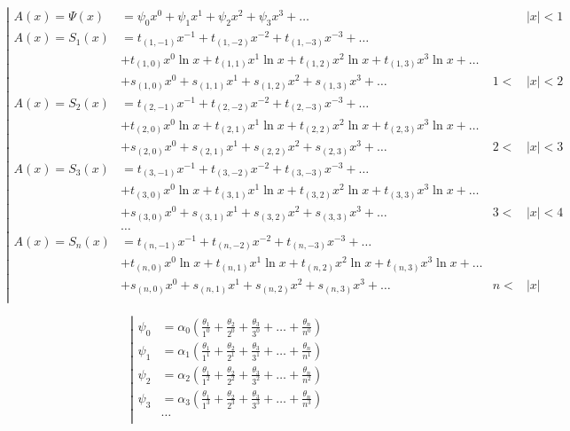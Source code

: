 \begin{equation*} \left| \begin{aligned}
A(x) = \Psi(x) &=
  \psi_0 x^0
+ \psi_1 x^1
+ \psi_2 x^2
+ \psi_3 x^3
+ \ldots &
&|x| < 1 \\
%
A(x) = S_1(x) &= 
  t_{(1,-1)} x^{-1}
+ t_{(1,-2)} x^{-2}
+ t_{(1,-3)} x^{-3}
+ \ldots \\ &
+ t_{(1,0)} x^0 \ln{x}
+ t_{(1,1)} x^1 \ln{x}
+ t_{(1,2)} x^2 \ln{x}
+ t_{(1,3)} x^3 \ln{x}
+ \ldots \\ &
+ s_{(1,0)} x^0
+ s_{(1,1)} x^1
+ s_{(1,2)} x^2
+ s_{(1,3)} x^3
+ \ldots &
1 < &|x| < 2 \\
%
A(x) = S_2(x) &= 
  t_{(2,-1)} x^{-1}
+ t_{(2,-2)} x^{-2}
+ t_{(2,-3)} x^{-3}
+ \ldots \\ &
+ t_{(2,0)} x^0 \ln{x}
+ t_{(2,1)} x^1 \ln{x}
+ t_{(2,2)} x^2 \ln{x}
+ t_{(2,3)} x^3 \ln{x}
+ \ldots \\ &
+ s_{(2,0)} x^0
+ s_{(2,1)} x^1
+ s_{(2,2)} x^2
+ s_{(2,3)} x^3
+ \ldots &
2 < &|x| < 3 \\
%
A(x) = S_3(x) &= 
  t_{(3,-1)} x^{-1}
+ t_{(3,-2)} x^{-2}
+ t_{(3,-3)} x^{-3}
+ \ldots \\ &
+ t_{(3,0)} x^0 \ln{x}
+ t_{(3,1)} x^1 \ln{x}
+ t_{(3,2)} x^2 \ln{x}
+ t_{(3,3)} x^3 \ln{x}
+ \ldots \\ &
+ s_{(3,0)} x^0
+ s_{(3,1)} x^1
+ s_{(3,2)} x^2
+ s_{(3,3)} x^3
+ \ldots &
3 < &|x| < 4 \\
%
&\ldots \\
%
A(x) = S_n(x) &= 
  t_{(n,-1)} x^{-1}
+ t_{(n,-2)} x^{-2}
+ t_{(n,-3)} x^{-3}
+ \ldots \\ &
+ t_{(n,0)} x^0 \ln{x}
+ t_{(n,1)} x^1 \ln{x}
+ t_{(n,2)} x^2 \ln{x}
+ t_{(n,3)} x^3 \ln{x}
+ \ldots \\ &
+ s_{(n,0)} x^0
+ s_{(n,1)} x^1
+ s_{(n,2)} x^2
+ s_{(n,3)} x^3
+ \ldots &
n < &|x| \\
\end{aligned} \right. \end{equation*}

\begin{equation*} \left| \begin{aligned}
\psi_0 &= \alpha_0 \left(
  \frac{\theta_1}{1^0}
+ \frac{\theta_2}{2^0}
+ \frac{\theta_3}{3^0}
+ \ldots
+ \frac{\theta_n}{n^0} \right) \\
%
\psi_1 &= \alpha_1 \left(
  \frac{\theta_1}{1^1}
+ \frac{\theta_2}{2^1}
+ \frac{\theta_3}{3^1}
+ \ldots
+ \frac{\theta_n}{n^1} \right) \\
%
\psi_2 &= \alpha_2 \left(
  \frac{\theta_1}{1^2}
+ \frac{\theta_2}{2^2}
+ \frac{\theta_3}{3^2}
+ \ldots
+ \frac{\theta_n}{n^2} \right) \\
%
\psi_3 &= \alpha_3 \left(
  \frac{\theta_1}{1^3}
+ \frac{\theta_2}{2^3}
+ \frac{\theta_3}{3^3}
+ \ldots
+ \frac{\theta_n}{n^3} \right) \\
%
&\ldots \\
\end{aligned} \right. \end{equation*}

